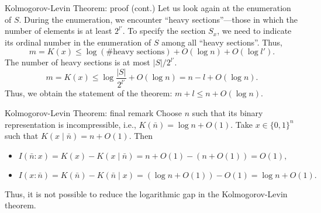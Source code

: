 \documentclass[aspectratio=169]{beamer}
\begin{document}
\begin{frame}{Kolmogorov-Levin Theorem: proof (cont.)}
    Let us look again at the enumeration of $S$. During the enumeration, we encounter ``heavy sections''—those in which the number of elements is at least $2^{l'}$. To specify the section $S_x$, we need to indicate its ordinal number in the enumeration of $S$ among all ``heavy sections''. Thus,
    \[
    m = K(x) \le \log(\text{\# heavy sections}) + O(\log n) + O(\log l').
    \]
    The number of heavy sections is at most $|S|/2^{l'}$.
    \[
    m = K(x) \le \log \frac{|S|}{2^{l'}} + O(\log n) = n - l + O(\log n).
    \]
    Thus, we obtain the statement of the theorem: $m + l \le n + O(\log n)$.

\end{frame}

\begin{frame}{Kolmogorov-Levin Theorem: final remark}
    Choose $n$ such that its binary representation is incompressible, i.e., $K(\bar n) = \log n + O(1)$. Take $x \in \{0,1\}^n$ such that $K(x \mid \bar n) = n + O(1)$. Then
\begin{itemize}
    \item\(
    I(\bar n : x) = K(x) - K(x \mid \bar n) = n + O(1) - (n + O(1)) = O(1),
    \)
    \item\(
    I(x : \bar n) = K(\bar n) - K(\bar n \mid x) = (\log n + O(1)) - O(1) = \log n + O(1).
    \)
\end{itemize}
Thus, it is not possible to reduce the logarithmic gap in the Kolmogorov-Levin theorem.
\end{frame}
\end{document}
